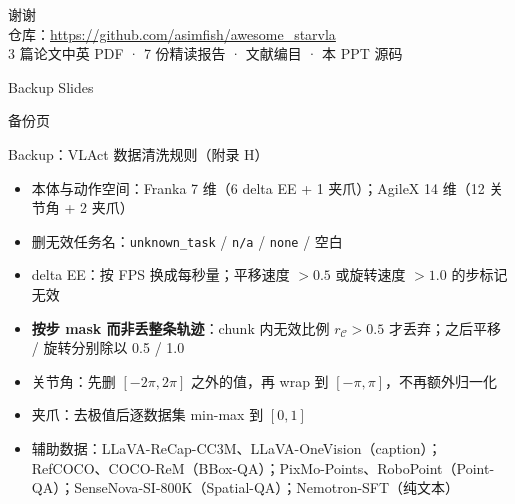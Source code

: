 \documentclass[aspectratio=169,10pt]{beamer}
\begin{document}
\begin{frame}
  \begin{center}
    {\Large 谢谢}\\[10pt]
    \normalsize 仓库：\url{https://github.com/asimfish/awesome_starvla}\\[4pt]
    \small 3 篇论文中英 PDF · 7 份精读报告 · 文献编目 · 本 PPT 源码
  \end{center}
\end{frame}

\appendix
\begin{frame}{Backup Slides}
  \begin{center}\Large 备份页\end{center}
\end{frame}

\begin{frame}{Backup：VLAct 数据清洗规则（附录 H）}
  \begin{itemize}
    \item 本体与动作空间：Franka 7 维（6 delta EE + 1 夹爪）；AgileX 14 维（12 关节角 + 2 夹爪）
    \item 删无效任务名：\texttt{unknown\_task} / \texttt{n/a} / \texttt{none} / 空白
    \item delta EE：按 FPS 换成每秒量；平移速度 $>0.5$ 或旋转速度 $>1.0$ 的步标记无效
    \item \textbf{按步 mask 而非丢整条轨迹}：chunk 内无效比例 $r_{\mathcal C} > 0.5$ 才丢弃；之后平移 / 旋转分别除以 0.5 / 1.0
    \item 关节角：先删 $[-2\pi, 2\pi]$ 之外的值，再 wrap 到 $[-\pi,\pi]$，不再额外归一化
    \item 夹爪：去极值后逐数据集 min-max 到 $[0,1]$
    \item 辅助数据：LLaVA-ReCap-CC3M、LLaVA-OneVision（caption）；RefCOCO、COCO-ReM（BBox-QA）；PixMo-Points、RoboPoint（Point-QA）；SenseNova-SI-800K（Spatial-QA）；Nemotron-SFT（纯文本）
  \end{itemize}
\end{frame}
\end{document}
